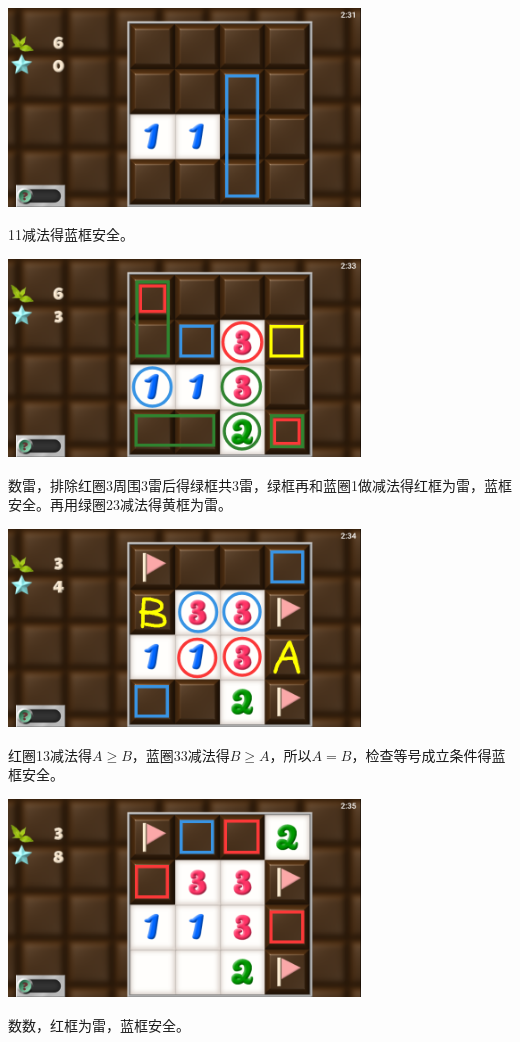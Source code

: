 \subsection{} %
\begin{center}
    \includegraphics[width=0.7\textwidth]{puzzle/149-1.png}
\end{center}
11减法得蓝框安全。
\begin{center}
    \includegraphics[width=0.7\textwidth]{puzzle/149-2.png}
\end{center}
数雷，排除红圈3周围3雷后得绿框共3雷，绿框再和蓝圈1做减法得红框为雷，蓝框安全。再用绿圈23减法得黄框为雷。
\begin{center}
    \includegraphics[width=0.7\textwidth]{puzzle/149-3.png}
\end{center}
红圈13减法得$A\ge B$，蓝圈33减法得$B\ge A$，所以$A=B$，检查等号成立条件得蓝框安全。
\begin{center}
    \includegraphics[width=0.7\textwidth]{puzzle/149-4.png}
\end{center}
数数，红框为雷，蓝框安全。

